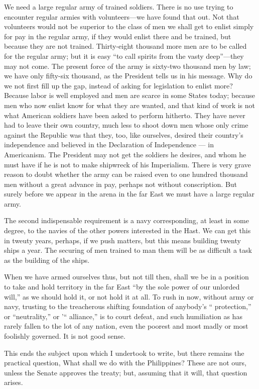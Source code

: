 \documentclass[11pt,openany]{book}
\begin{document}
We need a large regular army of trained soldiers. There is no use trying to encounter regular armies with volunteers---we have found that out. Not that volunteers would not be superior to the class of men we shall get to enlist simply for pay in the regular army, if they would enlist there and be trained, but because they are not trained. Thirty-eight thousand more men are to be called for the regular army; but it is easy ``to call spirits from the vasty deep''---they may not come. The present force of the army is sixty-two thousand men by law; we have only fifty-six thousand, as the President tells us in his message. Why do we not first fill up the gap, instead of asking for legislation to enlist more? Because labor is well employed and men are scarce in some States today; because men who now enlist know for what they are wanted, and that kind of work is not what American soldiers have been asked to perform hitherto. They have never had to leave their own country, much less to shoot down men whose only crime against the Republic was that they, too, like ourselves, desired their country's independence and believed in the Declaration of Independence --- in Americanism. The President may not get the soldiers he desires, and whom he must have if he is not to make shipwreck of his Imperialism. There is very grave reason to doubt whether the army can be raised even to one hundred thousand men without a great advance in pay, perhaps not without conscription. But surely before we appear in the arena in the far East we must have a large regular army.

The second indispensable requirement is a navy corresponding, at least in some degree, to the navies of the other powers interested in the Hast. We can get this in tweuty years, perhaps, if we push matters, but this means building twenty ships a year. The securing of men trained to man them will be as difficult a task as the building of the ships.

When we have armed ourselves thus, but not till then, shall we be in a position to take and hold territory in the far East ``by the sole power of our unlorded will,'' as we should hold it, or not hold it at all. To rush in now, without army or navy, trusting to the treacherous shifting foundation of anybody's `` protection,'' or ``neutrality,'' or '`` alliance,'' is to court defeat, and such humiliation as has rarely fallen to the lot of any nation, even the poorest and most madly or most foolishly governed. It is not good sense.

This ends the subject upon which I undertook to write, but there remains the practical question, What shall we do with the Philippines? These are not ours, unless the Senate approves the treaty; but, assuming that it will, that question arises.
\end{document}
